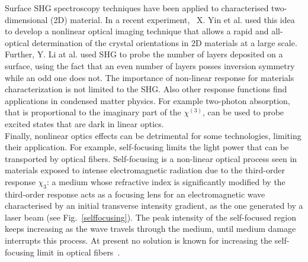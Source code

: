 Surface SHG spectroscopy techniques have been applied to characterised two-dimensional (2D) material. In a recent experiment,~\cite{yin2014edge}  X. Yin et al. used this idea to develop a nonlinear optical imaging technique that allows a rapid and all-optical determination of the crystal orientations in 2D materials at a large scale. %
Further, Y. Li at al. used SHG to probe the number of layers deposited on a surface, using the fact that an even number of layers posses inversion symmetry while an odd one does not.\cite{doi:10.1021/nl401561r} The importance of non-linear response for materials characterization is not limited to the SHG. Also other response functions find applications in condensed matter physics. For example two-photon absorption, that is proportional to the imaginary part of the $\chi^{(3)}$, can be used to probe excited states that are dark in linear optics.\cite{wang2005optical,cassabois2015hexagonal}\\

Finally, nonlinear optics effects can be detrimental for some technologies, limiting their application. For example, self-focusing limits the light power that can be transported by optical fibers. Self-focusing is a non-linear optical process seen in materials exposed to intense electromagnetic radiation due to the third-order response $\chi_3$:  a medium whose refractive index is significantly modified by the third-order response acts as a focusing lens for an electromagnetic wave characterised by an initial transverse intensity gradient, as the one generated by a laser beam (see Fig.~\ref{selffocusing}). The peak intensity of the self-focused region keeps increasing as the wave travels through the medium, until medium damage interrupts this process. At present no solution is known for increasing the self-focusing limit in optical fibers~\cite{encylaser}.

